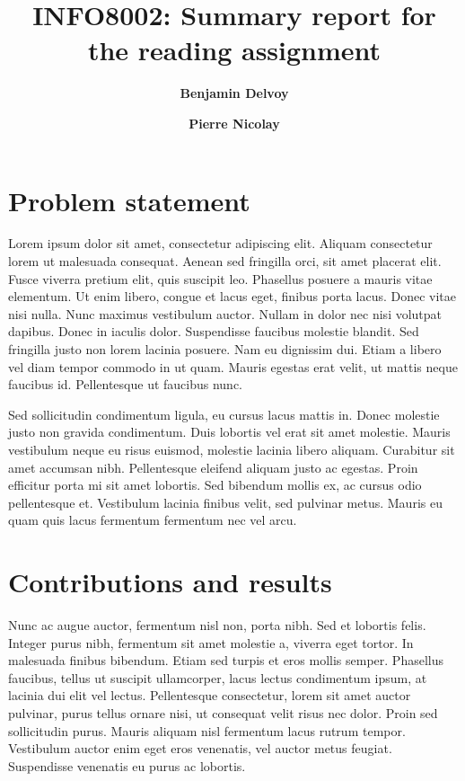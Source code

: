 \documentclass[twocolumn,superscriptaddress,aps]{revtex4-1}
\begin{document}

\title{\Large{INFO8002: Summary report for the reading assignment}}
\vspace{1cm}
\author{\small{\bf Benjamin Delvoy}}
\author{\small{\bf Pierre Nicolay}}

\maketitle


\section{Problem statement}
\cite{39966}
Lorem ipsum dolor sit amet, consectetur adipiscing elit. Aliquam consectetur lorem ut malesuada consequat. Aenean sed fringilla orci, sit amet placerat elit. Fusce viverra pretium elit, quis suscipit leo. Phasellus posuere a mauris vitae elementum. Ut enim libero, congue et lacus eget, finibus porta lacus. Donec vitae nisi nulla. Nunc maximus vestibulum auctor. Nullam in dolor nec nisi volutpat dapibus. Donec in iaculis dolor. Suspendisse faucibus molestie blandit. Sed fringilla justo non lorem lacinia posuere. Nam eu dignissim dui. Etiam a libero vel diam tempor commodo in ut quam. Mauris egestas erat velit, ut mattis neque faucibus id. Pellentesque ut faucibus nunc.

Sed sollicitudin condimentum ligula, eu cursus lacus mattis in. Donec molestie justo non gravida condimentum. Duis lobortis vel erat sit amet molestie. Mauris vestibulum neque eu risus euismod, molestie lacinia libero aliquam. Curabitur sit amet accumsan nibh. Pellentesque eleifend aliquam justo ac egestas. Proin efficitur porta mi sit amet lobortis. Sed bibendum mollis ex, ac cursus odio pellentesque et. Vestibulum lacinia finibus velit, sed pulvinar metus. Mauris eu quam quis lacus fermentum fermentum nec vel arcu.

\section{Contributions and results}

Nunc ac augue auctor, fermentum nisl non, porta nibh. Sed et lobortis felis. Integer purus nibh, fermentum sit amet molestie a, viverra eget tortor. In malesuada finibus bibendum. Etiam sed turpis et eros mollis semper. Phasellus faucibus, tellus ut suscipit ullamcorper, lacus lectus condimentum ipsum, at lacinia dui elit vel lectus. Pellentesque consectetur, lorem sit amet auctor pulvinar, purus tellus ornare nisi, ut consequat velit risus nec dolor. Proin sed sollicitudin purus. Mauris aliquam nisl fermentum lacus rutrum tempor. Vestibulum auctor enim eget eros venenatis, vel auctor metus feugiat. Suspendisse venenatis eu purus ac lobortis.
\end{document}
